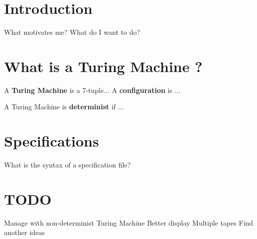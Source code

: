 \documentclass{article}
\begin{document}
\section{Introduction}
What motivates me? What do I want to do?
\section{What is a Turing Machine ?}
A \textbf{Turing Machine} is a 7-tuple...
A \textbf{configuration} is ...

A Turing Machine is \textbf{determinist} if ...

\section{Specifications}
What is the syntax of a specification file?

\section{TODO}
Manage with non-determinist Turing Machine
Better display
Multiple tapes
Find another ideas
\end{document}
